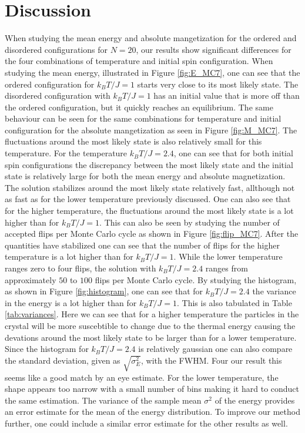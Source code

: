 \documentclass[twocolumn]{aastex62}
\begin{document}
\section{Discussion} \label{sec:discussion}
When studying the mean energy and absolute mangetization for the ordered and
disordered configurations for $N=20$, our results show significant differences
for the four combinations of temperature and initial spin configuration. When
studying the mean energy, illustrated in Figure \ref{fig:E_MC7}, one can see
that the ordered configuration for $k_BT/J=1$ starts very close to its most
likely state. The disordered configuration with $k_BT/J=1$ has an initial value
that is more off than the ordered configuration, but it quickly reaches an
equilibrium. The same behaviour can be seen for the same combinations for
temperature and initial configuration for the absolute mangetization as seen in
Figure \ref{fig:M_MC7}. The fluctuations around the most likely state is also
relatively small for this temperature. For the temperature $k_BT/J=2.4$, one can
see that for both initial spin configurations the discrepancy between
the most likely state and the initial state is relatively large for both the
mean energy and absolute magnetization. The solution stabilizes around the most
likely state relatively fast, allthough not as fast as for the lower temperature
previously discussed. One can also see that for the higher temperature, the
fluctuations around the most likely state is a lot higher than for $k_BT/J =1$.
This can also be seen by studying the number of accepted flips per Monte Carlo
cycle as shown in Figure \ref{fig:flip_MC7}. After the quantities have
stabilized one can see that the number of flips for the higher temperature is a
lot higher than for $k_BT/J=1$. While the lower temperature ranges zero to four
flips, the solution with $k_BT/J=2.4$ ranges from approximately $50$ to $100$
flips per Monte Carlo cycle. By studying the histogram, as shown in Figure
\ref{fig:histogram}, one can see that for $k_BT/J=2.4$ the variance in the
energy is a lot higher than for $k_BT/J=1$. This is also tabulated in Table
\ref{tab:variances}. Here we can see that for a higher temperature the particles
in the crystal will be more suscebtible to change due to the thermal energy causing the devations
around the most likely state to be larger than for a lower temperature. Since
the histogram for $k_BT/J=2.4$ is relatively gaussian one can also compare the
standard deviation, given as $\sqrt{\sigma_E^2}$, with the FWHM. Four our result
this seems like a good match by an eye estimate. For the lower temperature, the
shape appears too narrow with a small number of bins making it hard to conduct
the same estimation. The variance of the sample mean $\sigma^2$ of the energy
provides an error estimate for the mean of the energy distribution. To improve
our method further, one could include a similar error estimate for the other
results as well.\\\indent
\end{document}
